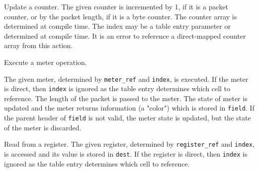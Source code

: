 \documentclass[12pt]{article}
\begin{document}

{ %
Update a counter.
}
{ %
}
{ %
The given counter is incremented by 1, if it is a packet counter, or by the 
packet length, if it is a byte counter.  The counter array is determined 
at compile time.  The index may be a table entry parameter or determined at 
compile time. It is an error to reference a direct-mapped counter array from 
this action.
}


{ %
Execute a meter operation.
}
{ %
}
{ %
The given meter, determined by \texttt{meter_ref} and \texttt{index}, is executed. If the 
meter is direct, then \texttt{index} is ignored as the table entry determines which 
cell to reference. The length of the packet is passed to the meter. The state 
of meter is updated and the meter returns information (a "color") which is 
stored in \texttt{field}. If the parent header of \texttt{field} is not valid, the meter 
state is updated, but the state of the meter is discarded.

}


{ %
Read from a register.
}
{ %
}
{ %
The given register, determined by \texttt{register_ref} and \texttt{index}, is accessed and its value is stored in \texttt{dest}. If the register is direct, then \texttt{index} is ignored as the table entry determines which 
cell to reference.
}
\end{document}

